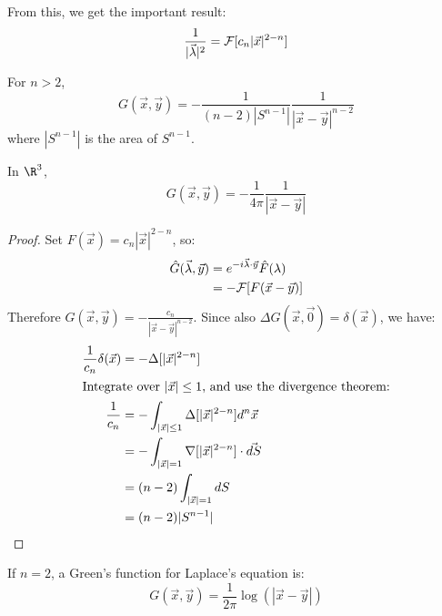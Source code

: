 \documentclass[../Main.tex]{subfiles}
\begin{document}
From this, we get the important result:
\begin{equation*}
    \frac{1}{|\vec{\lambda}|^2} = \mathcal{F}[c_n |\vec{x}|^{2-n}]
\end{equation*}
\begin{proposition}
    For $n > 2$,
    \begin{equation*}
        G(\vec{x}, \vec{y}) = -\frac{1}{(n-2) |S^{n-1}|} \frac{1}{|\vec{x} - \vec{y}|^{n-2}}
    \end{equation*}
    where $|S^{n-1}|$ is the area of $S^{n-1}$.
    \label{propFreeGreen}
\end{proposition}
\begin{remark}
    In $\R^3$,
    \begin{equation*}
        G(\vec{x}, \vec{y}) = -\frac{1}{4\pi} \frac{1}{|\vec{x} - \vec{y}|}
    \end{equation*}
\end{remark}
\begin{proof}
    Set $F(\vec{x}) = c_n |\vec{x}|^{2-n}$, so:
    \begin{align*}
        \hat{G}(\vec{\lambda}, \vec{y}) &= e^{-i \vec{\lambda} \cdot \vec{y}} \hat{F}(\lambda) \\
        &= -\mathcal{F}[F(\vec{x} - \vec{y})]
    \end{align*}
    Therefore $G(\vec{x}, \vec{y}) = -\frac{c_n}{|\vec{x} - \vec{y}|^{n-2}}$. Since also $\Delta G(\vec{x}, \vec{0}) = \delta(\vec{x})$, we have:
    \begin{align*}
        \frac1{c_n} \delta(\vec{x}) &= -\Delta[|\vec{x}|^{2-n}] \\
        \intertext{Integrate over $|\vec{x}| \leq 1$, and use the divergence theorem:}
        \frac1{c_n} &= -\int_{|\vec{x}| \leq 1} \Delta[|\vec{x}|^{2-n}] d^n \vec{x} \\
        &= -\int_{|\vec{x}| = 1} \nabla[|\vec{x}|^{2-n}] \cdot \vec{dS} \\
        &= (n-2)\int_{|\vec{x}| = 1} dS \\
        &= (n-2) |S^{n-1}|
    \end{align*}
\end{proof}
\begin{proposition}
    If $n = 2$, a Green's function for Laplace's equation is:
    \begin{equation*}
        G(\vec{x}, \vec{y}) = \frac1{2\pi} \log\left(|\vec{x} - \vec{y}|\right)
    \end{equation*}
    \label{propFreeGreenR2}
\end{proposition}
\end{document}
